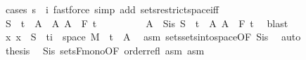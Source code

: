 \begin{isabellebody}
\ {\isacharparenleft}{\kern0pt}cases\ {\isachardoublequoteopen}s\ {\isasymle}\ i{\isachardoublequoteclose}{\isacharparenright}{\kern0pt}\ {\isacharparenleft}{\kern0pt}fastforce\ simp\ add{\isacharcolon}{\kern0pt}\ sets{\isacharunderscore}{\kern0pt}restrict{\isacharunderscore}{\kern0pt}space{\isacharunderscore}{\kern0pt}iff{\isacharparenright}{\kern0pt}{\isacharplus}{\kern0pt}\isanewline
\ \ \ \ \isamarkupfalse%
\isanewline
\ \ \ \ \ \ \isamarkupfalse%
\ {\isachardoublequoteopen}S\ {\isasymin}\ {\isacharbraceleft}{\kern0pt}{\isacharbraceleft}{\kern0pt}t\ {\isasymtimes}\ A\ {\isacharbar}{\kern0pt}\ A{\isachardot}{\kern0pt}\ A\ {\isasymin}\ F\ t\isanewline
\ \ \ \ \ \ \isamarkupfalse%
\ \isamarkupfalse%
\ A\ \ S{\isacharunderscore}{\kern0pt}is{\isacharcolon}{\kern0pt}\ {\isachardoublequoteopen}S\ {\isacharequal}{\kern0pt}\ {\isacharbraceleft}{\kern0pt}t\ {\isasymtimes}\ A{\isachardoublequoteclose}\ {\isachardoublequoteopen}A\ {\isasymin}\ F\ t\ \isamarkupfalse%
\ blast\isanewline
\ \ \ \ \ \ \isamarkupfalse%
\ {\isachardoublequoteopen}{\isacharparenleft}{\kern0pt}{\isasymlambda}x{\isachardot}{\kern0pt}\ x{\isacharparenright}{\kern0pt}\ {\isacharminus}{\kern0pt}{\isacharbackquote}{\kern0pt}\ S\ {\isasyminter}\ {\isacharparenleft}{\kern0pt}{\isacharbraceleft}{\kern0pt}ti{\isacharbraceright}{\kern0pt}\ {\isasymtimes}\ space\ M{\isacharparenright}{\kern0pt}\ {\isacharequal}{\kern0pt}\ {\isacharbraceleft}{\kern0pt}t\ {\isasymtimes}\ A{\isachardoublequoteclose}\ \isamarkupfalse%
\ asm\ sets{\isachardot}{\kern0pt}sets{\isacharunderscore}{\kern0pt}into{\isacharunderscore}{\kern0pt}space{\isacharbrackleft}{\kern0pt}OF\ S{\isacharunderscore}{\kern0pt}is{\isacharparenleft}{\kern0pt}{}{\isacharparenright}{\kern0pt}{\isacharbrackright}{\kern0pt}\ \isamarkupfalse%
\ auto\isanewline
\ \ \ \ \ \ \isamarkupfalse%
\ {\isacharquery}{\kern0pt}thesis\ \isamarkupfalse%
\ S{\isacharunderscore}{\kern0pt}is{\isacharparenleft}{\kern0pt}{}{\isacharparenright}{\kern0pt}\ sets{\isacharunderscore}{\kern0pt}F{\isacharunderscore}{\kern0pt}mono{\isacharbrackleft}{\kern0pt}OF\ order{\isacharunderscore}{\kern0pt}refl\ asm{\isacharbrackright}{\kern0pt}\ asm\ \isamarkupfalse%

\end{isabellebody}
